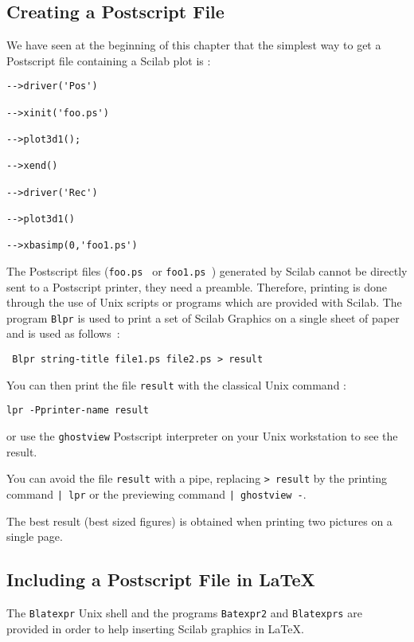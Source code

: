 \subsection{Creating a Postscript File}
We have seen at the beginning of this chapter that the simplest way to get 
a Postscript file containing a Scilab plot is :

\begin{verbatim}
-->driver('Pos')
 
-->xinit('foo.ps')
 
-->plot3d1();
 
-->xend()
 
-->driver('Rec')
 
-->plot3d1()
 
-->xbasimp(0,'foo1.ps')

\end{verbatim}


The Postscript files ({\tt foo.ps } or {\tt foo1.ps }) generated by Scilab 
cannot be directly sent to a
Postscript printer, they need a preamble. Therefore, printing is done
through the use of Unix scripts or programs which are provided with
Scilab. The program \verb+Blpr+ is used to print a set of Scilab Graphics 
on a single sheet of paper and is used as follows~:

\begin{verbatim}
 Blpr string-title file1.ps file2.ps > result
\end{verbatim}

You can then print the file  {\tt result} with the classical Unix command :

\begin{verbatim}
lpr -Pprinter-name result
\end{verbatim}

\noindent or use the \verb+ghostview+ Postscript interpreter on your Unix
workstation to see the result.

You can avoid the file {\tt result} with a pipe, replacing {\tt  > result}
by the printing command {\tt | lpr} or the previewing command 
{\tt | ghostview -}.

The best result (best sized figures) is obtained when printing two 
pictures on a single page. 


\subsection{Including a Postscript File in \LaTeX}

The \verb|Blatexpr| Unix shell and the programs \verb+Batexpr2+ and 
\verb+Blatexprs+ are provided in order to help inserting Scilab graphics 
in \LaTeX .

